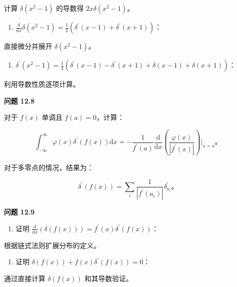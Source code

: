 计算 \(\delta\left( x^{2} - 1 \right)\) 的导数得
\(2x\delta\left( x^{2} - 1 \right)\)。

\begin{enumerate}
\def\labelenumi{(\alph{enumi})}
\setcounter{enumi}{2}
\item
  \(\frac{\mathrm{d}}{\mathrm{d}x}\delta\left( x^{2} - 1 \right) = \frac{1}{2}\left( \delta^{\prime}(x - 1) + \delta^{\prime}(x + 1) \right)\)：
\end{enumerate}

直接微分并展开 \(\delta\left( x^{2} - 1 \right)\)。

\begin{enumerate}
\def\labelenumi{(\alph{enumi})}
\setcounter{enumi}{3}
\item
  \(\delta^{\prime}\left( x^{2} - 1 \right) = \frac{1}{4}\left( \delta^{\prime}(x - 1) - \delta^{\prime}(x + 1) + \delta(x - 1) + \delta(x + 1) \right)\)：
\end{enumerate}

利用导数性质逐项计算。

\textbf{问题 12.8}

对于 \(f(x)\) 单调且 \(f(a) = 0\)，计算：

\[\int_{- \infty}^{\infty}\varphi(x)\delta^{\prime}\left( f(x) \right)\mathrm{d}x = - \frac{1}{f^{\prime}(a)}\frac{\mathrm{d}}{\mathrm{d}x}\left( \frac{\varphi(x)}{\left| f^{\prime}(x) \right|} \right)|_{x = a}。\]

对于多零点的情况，结果为：

\[\delta^{\prime}\left( f(x) \right) = \sum_{i}\frac{1}{\left| f^{\prime}\left( a_{i} \right) \right|}\delta_{a_{i}}^{\prime}。\]

\textbf{问题 12.9}

\begin{enumerate}
\def\labelenumi{(\alph{enumi})}
\item
  证明
  \(\frac{\mathrm{d}}{\mathrm{d}x}\left( \delta\left( f(x) \right) \right) = f^{\prime}(x)\delta^{\prime}\left( f(x) \right)\)：
\end{enumerate}

根据链式法则扩展分布的定义。

\begin{enumerate}
\def\labelenumi{(\alph{enumi})}
\setcounter{enumi}{1}
\item
  证明
  \(\delta\left( f(x) \right) + f(x)\delta^{\prime}\left( f(x) \right) = 0\)：
\end{enumerate}

通过直接计算 \(\delta\left( f(x) \right)\) 和其导数验证。

